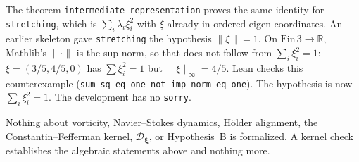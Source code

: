 \documentclass[11pt,a4paper]{article}
\begin{document}
The theorem \texttt{intermediate\_representation} proves the same identity for \texttt{stretching}, which is \(\sum_i\lambda_i\xi_i^2\) with \(\xi\) already in ordered eigen-coordinates. An earlier skeleton gave \texttt{stretching} the hypothesis \(\|\xi\|=1\). On \(\mathrm{Fin}\,3\to\mathbb{R}\), Mathlib's \(\|\cdot\|\) is the sup norm, so that does not follow from \(\sum_i\xi_i^2=1\): \(\xi=(3/5,4/5,0)\) has \(\sum\xi_i^2=1\) but \(\|\xi\|_\infty=4/5\). Lean checks this counterexample (\texttt{sum\_sq\_eq\_one\_not\_imp\_norm\_eq\_one}). The hypothesis is now \(\sum_i\xi_i^2=1\). The development has no \texttt{sorry}.

Nothing about vorticity, Navier--Stokes dynamics, H\"older alignment, the Constantin--Fefferman kernel, \(\mathcal{D}_{\boldsymbol\xi}\), or Hypothesis~B is formalized. A kernel check establishes the algebraic statements above and nothing more.
\end{document}
